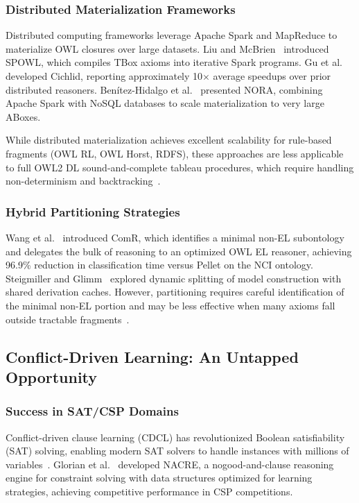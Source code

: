 \documentclass[preprint,12pt]{elsarticle}
\begin{document}
\subsubsection{Distributed Materialization Frameworks}

Distributed computing frameworks leverage Apache Spark and MapReduce to materialize OWL closures over large datasets. Liu and McBrien~\cite{liu2017spowl} introduced SPOWL, which compiles TBox axioms into iterative Spark programs. Gu et al.~\cite{gu2015cichlid} developed Cichlid, reporting approximately 10$\times$ average speedups over prior distributed reasoners. Benítez-Hidalgo et al.~\cite{benitez2023nora} presented NORA, combining Apache Spark with NoSQL databases to scale materialization to very large ABoxes.

While distributed materialization achieves excellent scalability for rule-based fragments (OWL RL, OWL Horst, RDFS), these approaches are less applicable to full OWL2 DL sound-and-complete tableau procedures, which require handling non-determinism and backtracking~\cite{wu2016parallel}.

\subsubsection{Hybrid Partitioning Strategies}

Wang et al.~\cite{wang2019comr} introduced ComR, which identifies a minimal non-EL subontology and delegates the bulk of reasoning to an optimized OWL EL reasoner, achieving 96.9\% reduction in classification time versus Pellet on the NCI ontology. Steigmiller and Glimm~\cite{steigmiller2020parallelised} explored dynamic splitting of model construction with shared derivation caches. However, partitioning requires careful identification of the minimal non-EL portion and may be less effective when many axioms fall outside tractable fragments~\cite{wang2019comr}.

\subsection{Conflict-Driven Learning: An Untapped Opportunity}

\subsubsection{Success in SAT/CSP Domains}

Conflict-driven clause learning (CDCL) has revolutionized Boolean satisfiability (SAT) solving, enabling modern SAT solvers to handle instances with millions of variables~\cite{marques1999grasp}. Glorian et al.~\cite{glorian2020nacre} developed NACRE, a nogood-and-clause reasoning engine for constraint solving with data structures optimized for learning strategies, achieving competitive performance in CSP competitions.
\end{document}
